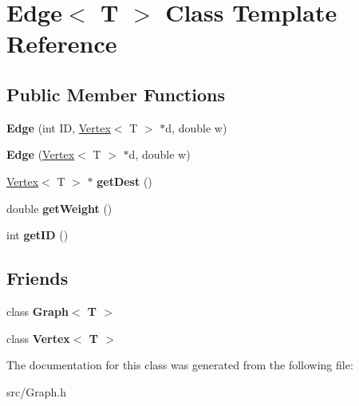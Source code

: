 \hypertarget{class_edge}{}\section{Edge$<$ T $>$ Class Template Reference}
\label{class_edge}
\subsection*{Public Member Functions}
\begin{DoxyCompactItemize}
\item 
\hypertarget{class_edge_ab4520cf1aca4b47f8e10abcb65012596}{}\label{class_edge_ab4520cf1aca4b47f8e10abcb65012596} 
{\bfseries Edge} (int ID, \hyperlink{class_vertex}{Vertex}$<$ T $>$ $\ast$d, double w)
\item 
\hypertarget{class_edge_a9da861a03f920c89984be33515a5d870}{}\label{class_edge_a9da861a03f920c89984be33515a5d870} 
{\bfseries Edge} (\hyperlink{class_vertex}{Vertex}$<$ T $>$ $\ast$d, double w)
\item 
\hypertarget{class_edge_aaac5b053bdaa88b1da416e734487eb25}{}\label{class_edge_aaac5b053bdaa88b1da416e734487eb25} 
\hyperlink{class_vertex}{Vertex}$<$ T $>$ $\ast$ {\bfseries get\+Dest} ()
\item 
\hypertarget{class_edge_a5203c0721c87e9c035ad62c796a1725e}{}\label{class_edge_a5203c0721c87e9c035ad62c796a1725e} 
double {\bfseries get\+Weight} ()
\item 
\hypertarget{class_edge_a22ae1f22a8e2c5e6ee89b9320cb62450}{}\label{class_edge_a22ae1f22a8e2c5e6ee89b9320cb62450} 
int {\bfseries get\+ID} ()
\end{DoxyCompactItemize}
\subsection*{Friends}
\begin{DoxyCompactItemize}
\item 
\hypertarget{class_edge_aefa9b76cd57411c5354e5620dc2d84dd}{}\label{class_edge_aefa9b76cd57411c5354e5620dc2d84dd} 
class {\bfseries Graph$<$ T $>$}
\item 
\hypertarget{class_edge_a2e120a12dec663fa334633b4f26cbed8}{}\label{class_edge_a2e120a12dec663fa334633b4f26cbed8} 
class {\bfseries Vertex$<$ T $>$}
\end{DoxyCompactItemize}


The documentation for this class was generated from the following file\+:\begin{DoxyCompactItemize}
\item 
src/Graph.\+h\end{DoxyCompactItemize}
